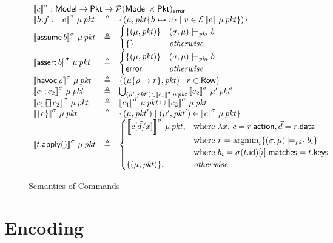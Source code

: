 \documentclass{article}
\newcommand{\pkt}{\mathit{pkt}}
\newcommand{\error}{\mathsf{error}}
\newcommand{\denote}[1]{\left\llbracket#1\right\rrbracket}
\newcommand{\edenote}[1]{\mathcal{E}\denote{#1}}
\newcommand{\Pkt}{\mathsf{Pkt}}
\newcommand{\Model}{\mathsf{Model}}
\newcommand{\Row}{\mathsf{Row}}
\newcommand{\matches}{\mathsf{matches}}
\newcommand{\action}{\mathsf{action}}
\newcommand{\keys}{\mathsf{keys}}
\newcommand{\data}{\mathsf{data}}
\newcommand{\id}{\mathsf{id}}
\newcommand{\assert}{\mathop{\mathsf{assert}}}
\newcommand{\assume}{\mathop{\mathsf{assume}}}
\newcommand{\apply}{\mathsf{apply}}
\newcommand{\choiceop}{\rotatebox[origin=c]{90}{$\sqsubset\!\!\!\sqsupset$}}
\newcommand{\choice}{\mathbin{\choiceop}}
\newcommand{\havoc}[1]{\mathop{\textsf{havoc}}#1}
\newcommand{\argmin}{\mathop{\textrm{argmin}}}
\newcommand{\satisfy}[3]{({#1,#3}) \models_{#2}}
\begin{document}
\begin{figure}[htp]
  \[\begin{array}{l >{\triangleq}cl}
  \multicolumn{3}{l}{\denote{c}^\sigma : \Model \to \Pkt \to \mathcal{P}(\Model \times \Pkt)_\error }\\
    \denote{h.f := e}^\sigma\,\mu\,\pkt && \{(\mu, \pkt\{h \mapsto v\} \mid v \in \edenote{e}\,\mu\,\pkt\})\} \\
    \denote{\assume b}^\sigma\,\mu\,\pkt &&
    \begin{cases}
      \{(\mu,\pkt)\} & \satisfy \sigma \pkt \mu b \\
      \{\} & \textit{otherwise} \\
    \end{cases}\\
    \denote{\assert b}^\sigma\,\mu\,\pkt &&
    \begin{cases}
      \{(\mu,\pkt)\} & \satisfy \sigma \pkt \mu b \\
      \error & \textit{otherwise}
    \end{cases} \\
    \denote{\havoc \rho}^\sigma\,\mu\,\pkt &&
    \{(\mu\{\rho \mapsto r\}, \pkt) \mid r \in \Row\} \\
    \denote{c_1;c_2}^\sigma\,\mu\,\pkt&&
    \bigcup_{(\mu',\pkt') \in \denote{c_1}^\sigma\,\mu\,\pkt}\denote{c_2}^\sigma\,\mu'\,\pkt' \\
    \denote{c_1 \choice c_2}^\sigma\,\mu\,\pkt &&
    \denote{c_1}^\sigma\,\mu\,\pkt \cup \denote{c_2}^\sigma\,\mu\,\pkt \\
    \denote{\{c\}}^\sigma\,\mu\,\pkt &&
    \{(\mu,\pkt') \mid (\mu',\pkt') \in \denote{c}^\sigma\,\mu\,\pkt \}\\
    \denote{t.\apply()}^\sigma\,\mu\,\pkt &&
    \begin{cases}
      \denote{c[\vec d/\vec x]}^\sigma\,\mu\,\pkt,
      & \text{where}~\lambda \vec x.~c = r.\action, \vec d = r.\data \\
      & \text{where}~r = \argmin_i\{\satisfy \sigma \pkt \mu b_i\} \\
      & \text{where}~b_i = \sigma(t.\id)[i].\matches = t.\keys \\
      \{(\mu,\pkt)\}, & \mathit{otherwise}
    \end{cases}
  \end{array}\]
  \caption{Semantics of Commands}
  \label{fig:com-sem}
\end{figure}

\section{Encoding}
\end{document}
